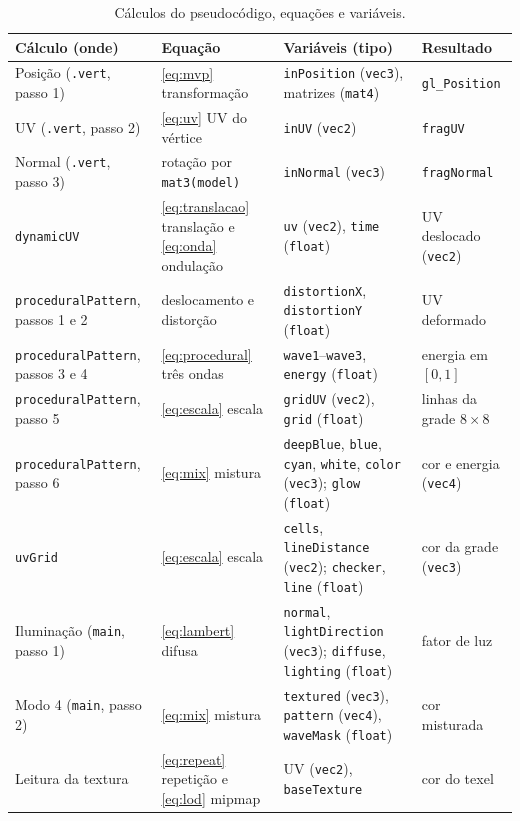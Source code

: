 \begin{table}[H]
\centering
\caption{Cálculos do pseudocódigo, equações e variáveis.}
\label{tab:shader-equacoes}
\footnotesize
\begin{tabular}{>{\raggedright\arraybackslash}p{3.3cm}>{\raggedright\arraybackslash}p{2.3cm}>{\raggedright\arraybackslash}p{4.8cm}>{\raggedright\arraybackslash}p{3.6cm}}
\toprule
\textbf{Cálculo (onde)} & \textbf{Equação} & \textbf{Variáveis (tipo)} & \textbf{Resultado} \\
\midrule
Posição (\texttt{.vert}, passo 1) & \eqref{eq:mvp} transformação & \texttt{inPosition} (\texttt{vec3}), matrizes (\texttt{mat4}) & \texttt{gl\_Position} \\
UV (\texttt{.vert}, passo 2) & \eqref{eq:uv} UV do vértice & \texttt{inUV} (\texttt{vec2}) & \texttt{fragUV} \\
Normal (\texttt{.vert}, passo 3) & rotação por \texttt{mat3(model)} & \texttt{inNormal} (\texttt{vec3}) & \texttt{fragNormal} \\
\texttt{dynamicUV} & \eqref{eq:translacao} translação e \eqref{eq:onda} ondulação & \texttt{uv} (\texttt{vec2}), \texttt{time} (\texttt{float}) & UV deslocado (\texttt{vec2}) \\
\texttt{proceduralPattern}, passos 1 e 2 & deslocamento e distorção & \texttt{distortionX}, \texttt{distortionY} (\texttt{float}) & UV deformado \\
\texttt{proceduralPattern}, passos 3 e 4 & \eqref{eq:procedural} três ondas & \texttt{wave1}--\texttt{wave3}, \texttt{energy} (\texttt{float}) & energia em \([0,1]\) \\
\texttt{proceduralPattern}, passo 5 & \eqref{eq:escala} escala & \texttt{gridUV} (\texttt{vec2}), \texttt{grid} (\texttt{float}) & linhas da grade \(8\times8\) \\
\texttt{proceduralPattern}, passo 6 & \eqref{eq:mix} mistura & \texttt{deepBlue}, \texttt{blue}, \texttt{cyan}, \texttt{white}, \texttt{color} (\texttt{vec3}); \texttt{glow} (\texttt{float}) & cor e energia (\texttt{vec4}) \\
\texttt{uvGrid} & \eqref{eq:escala} escala & \texttt{cells}, \texttt{lineDistance} (\texttt{vec2}); \texttt{checker}, \texttt{line} (\texttt{float}) & cor da grade (\texttt{vec3}) \\
Iluminação (\texttt{main}, passo 1) & \eqref{eq:lambert} difusa & \texttt{normal}, \texttt{lightDirection} (\texttt{vec3}); \texttt{diffuse}, \texttt{lighting} (\texttt{float}) & fator de luz \\
Modo 4 (\texttt{main}, passo 2) & \eqref{eq:mix} mistura & \texttt{textured} (\texttt{vec3}), \texttt{pattern} (\texttt{vec4}), \texttt{waveMask} (\texttt{float}) & cor misturada \\
Leitura da textura & \eqref{eq:repeat} repetição e \eqref{eq:lod} mipmap & UV (\texttt{vec2}), \texttt{baseTexture} & cor do texel \\
\bottomrule
\end{tabular}
\end{table}

